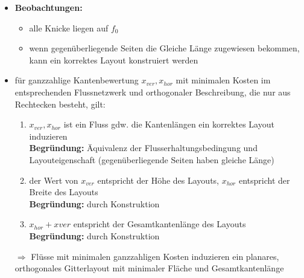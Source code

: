 \begin{itemize}[itemsep=-1pt]
	\vspace*{-3\baselineskip}
	\item \textbf{Beobachtungen:}
		\begin{itemize}
			\item alle Knicke liegen auf $f_0$
			\item wenn gegenüberliegende Seiten die Gleiche Länge zugewiesen bekommen, kann ein korrektes Layout konstruiert werden
		\end{itemize}
	\item für ganzzahlige Kantenbewertung $x_{ver},x_{hor}$ mit minimalen Kosten im entsprechenden Flussnetzwerk und orthogonaler Beschreibung, die nur aus Rechtecken besteht, gilt:
		\begin{enumerate}[itemsep=-1pt]
			\item $x_{ver},x_{hor}$ ist ein Fluss gdw. die Kantenlängen ein korrektes Layout induzieren\\
			\textbf{Begründung:} Äquivalenz der Flusserhaltungsbedingung und Layouteigenschaft (gegenüberliegende Seiten haben gleiche Länge)
			\item der Wert von $x_{ver}$ entspricht der Höhe des Layouts, $x_{hor}$ entspricht der Breite des Layouts\\
			\textbf{Begründung:} durch Konstruktion
			\item $x_{hor}+x{ver}$ entspricht der Gesamtkantenlänge des Layouts\\
			\textbf{Begründung:} durch Konstruktion
		\end{enumerate}
	\item[$\Rightarrow$] Flüsse mit minimalen ganzzahligen Kosten induzieren ein planares, orthogonales Gitterlayout mit minimaler Fläche und Gesamtkantenlänge
\end{itemize}
\topbreak
\vspace*{-2\baselineskip}

